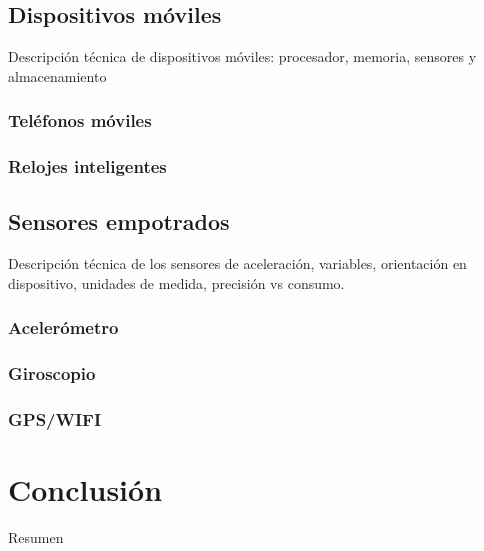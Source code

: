 \subsection{Dispositivos móviles}

\label{sec432:dispositivos-moviles}Descripción técnica de dispositivos
móviles: procesador, memoria, sensores y almacenamiento

\subsubsection{Teléfonos móviles}

\subsubsection{Relojes inteligentes}

\subsection{Sensores empotrados}

\label{sec433:sensores-empotrados}Descripción técnica de los sensores
de aceleración, variables, orientación en dispositivo, unidades de
medida, precisión vs consumo.

\subsubsection{Acelerómetro}

\subsubsection{Giroscopio}

\subsubsection{GPS/WIFI}

\section{Conclusión}

Resumen
